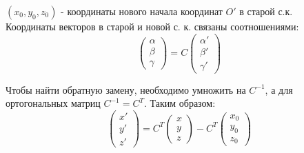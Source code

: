 \hspace{0.4cm}$(x_0, y_0, z_0)$ - координаты нового начала координат $O'$ в старой с.к.\\

Координаты векторов в старой и новой с. к. связаны соотношениями:
$$\begin{pmatrix}
	\alpha \\ \beta \\ \gamma
\end{pmatrix} = C \begin{pmatrix}
	\alpha' \\ \beta' \\ \gamma'
\end{pmatrix}$$

Чтобы найти обратную замену, необходимо умножить на $C^{-1}$, а для ортогональных матриц $C^{-1} = C^T$. Таким образом:
$$\begin{pmatrix}
	x' \\ y' \\ z'
\end{pmatrix} = C^T \begin{pmatrix}
	x \\ y \\ z
\end{pmatrix} - C^T \begin{pmatrix}
	x_0 \\ y_0 \\ z_0
\end{pmatrix}$$

